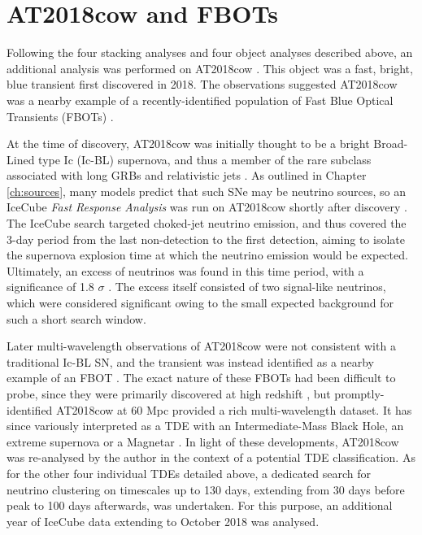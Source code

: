 \section{AT2018cow and FBOTs}

Following the four stacking analyses and four object analyses described above, an additional analysis was performed on AT2018cow . This object was a fast, bright, blue transient first discovered in 2018. The observations suggested AT2018cow was a nearby example of a recently-identified population of Fast Blue Optical Transients (FBOTs) . 

At the time of discovery, AT2018cow was initially thought to be a bright Broad-Lined type Ic (Ic-BL) supernova, and thus a member of the rare subclass associated with long GRBs and relativistic jets . As outlined in Chapter \ref{ch:sources}, many models predict that such SNe may be neutrino sources, so an IceCube \emph{Fast Response Analysis} was run on AT2018cow shortly after discovery . The IceCube search targeted choked-jet neutrino emission, and thus covered the 3-day period from the last non-detection to the first detection, aiming to isolate the supernova explosion time at which the neutrino emission would be expected. Ultimately, an excess of neutrinos was found in this time period, with a significance of 1.8 $\sigma$ . The excess itself consisted of two signal-like neutrinos, which were considered significant owing to the small expected background for such a short search window.

Later multi-wavelength observations of AT2018cow were not consistent with a traditional Ic-BL SN, and the transient was instead identified as a nearby example of an FBOT . The exact nature of these FBOTs had been difficult to probe, since they were primarily discovered at high redshift \cite{drout_fbot}, but promptly-identified AT2018cow at 60 Mpc provided a rich multi-wavelength dataset. It has since variously interpreted as a TDE with an Intermediate-Mass Black Hole, an extreme supernova or a Magnetar . In light of these developments, AT2018cow was re-analysed by the author in the context of a potential TDE classification. As for the other four individual TDEs detailed above, a dedicated search for neutrino clustering on timescales up to 130 days, extending from 30 days before peak to 100 days afterwards, was undertaken.  For this purpose, an additional year of IceCube data extending to October 2018 was analysed.

